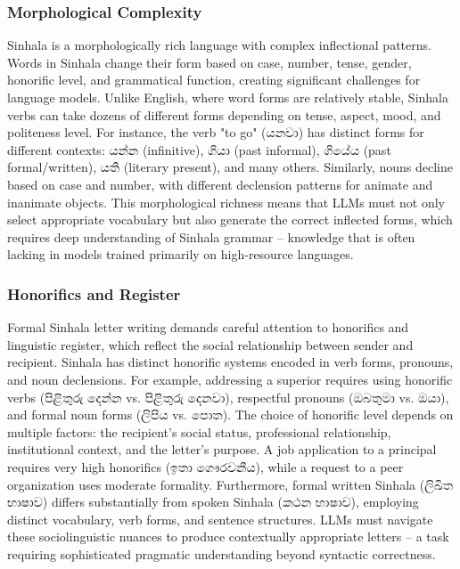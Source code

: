 \documentclass[12pt]{uomthesis}
\newcommand{\si}[1]{{\sinhalafont #1}}
\begin{document}
\subsubsection{Morphological Complexity}
Sinhala is a morphologically rich language with complex inflectional patterns. Words in Sinhala change their form based on case, number, tense, gender, honorific level, and grammatical function, creating significant challenges for language models. Unlike English, where word forms are relatively stable, Sinhala verbs can take dozens of different forms depending on tense, aspect, mood, and politeness level. For instance, the verb "to go" (\si{යනවා}) has distinct forms for different contexts: \si{යන්න} (infinitive), \si{ගියා} (past informal), \si{ගියේය} (past formal/written), \si{යති} (literary present), and many others. Similarly, nouns decline based on case and number, with different declension patterns for animate and inanimate objects. This morphological richness means that LLMs must not only select appropriate vocabulary but also generate the correct inflected forms, which requires deep understanding of Sinhala grammar – knowledge that is often lacking in models trained primarily on high-resource languages.

\subsubsection{Honorifics and Register}
Formal Sinhala letter writing demands careful attention to honorifics and linguistic register, which reflect the social relationship between sender and recipient. Sinhala has distinct honorific systems encoded in verb forms, pronouns, and noun declensions. For example, addressing a superior requires using honorific verbs (\si{පිළිතුරු දෙන්න} vs. \si{පිළිතුරු දෙනවා}), respectful pronouns (\si{ඔබතුමා} vs. \si{ඔයා}), and formal noun forms (\si{ලිපිය} vs. \si{පොත}). The choice of honorific level depends on multiple factors: the recipient's social status, professional relationship, institutional context, and the letter's purpose. A job application to a principal requires very high honorifics (\si{ඉතා ගෞරවනීය}), while a request to a peer organization uses moderate formality. Furthermore, formal written Sinhala (\si{ලිඛිත භාෂාව}) differs substantially from spoken Sinhala (\si{කථන භාෂාව}), employing distinct vocabulary, verb forms, and sentence structures. LLMs must navigate these sociolinguistic nuances to produce contextually appropriate letters – a task requiring sophisticated pragmatic understanding beyond syntactic correctness.
\end{document}
